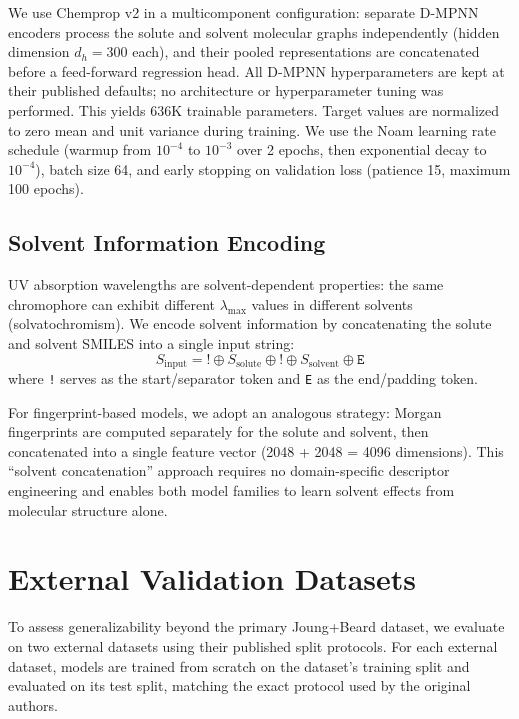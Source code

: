 We use Chemprop v2 in a multicomponent configuration: separate D-MPNN encoders process the solute and solvent molecular graphs independently (hidden dimension $d_h = 300$ each), and their pooled representations are concatenated before a feed-forward regression head.
All D-MPNN hyperparameters are kept at their published defaults\cite{yangAnalyzingLearnedMolecular2019}; no architecture or hyperparameter tuning was performed.
This yields 636K trainable parameters.
Target values are normalized to zero mean and unit variance during training.
We use the Noam learning rate schedule (warmup from $10^{-4}$ to $10^{-3}$ over 2 epochs, then exponential decay to $10^{-4}$), batch size 64, and early stopping on validation loss (patience 15, maximum 100 epochs).


\subsection{Solvent Information Encoding}
\label{sec:solvent}

UV absorption wavelengths are solvent-dependent properties: the same chromophore can exhibit different $\lambda_{\max}$ values in different solvents (solvatochromism)\cite{reichardt2011solvents}.
We encode solvent information by concatenating the solute and solvent SMILES into a single input string:
\begin{equation}
    S_{\text{input}} = \texttt{!} \oplus S_{\text{solute}} \oplus \texttt{!} \oplus S_{\text{solvent}} \oplus \texttt{E}
\end{equation}
where \texttt{!} serves as the start/separator token and \texttt{E} as the end/padding token.

For fingerprint-based models, we adopt an analogous strategy: Morgan fingerprints are computed separately for the solute and solvent, then concatenated into a single feature vector (2048 + 2048 = 4096 dimensions).
This ``solvent concatenation'' approach requires no domain-specific descriptor engineering and enables both model families to learn solvent effects from molecular structure alone.


\section{External Validation Datasets}
\label{sec:datasets}

To assess generalizability beyond the primary Joung+Beard dataset, we evaluate on two external datasets using their published split protocols.
For each external dataset, models are trained from scratch on the dataset's training split and evaluated on its test split, matching the exact protocol used by the original authors.


